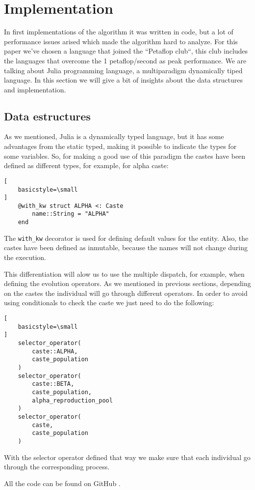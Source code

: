 \section{Implementation}

In first implementations of the algorithm it was written in code, but a lot of performance issues arised which
made the algorithm hard to analyze. For this paper we've chosen a language that joined the ``Petaflop club``, this club
includes the languages that overcome the 1 petaflop/second as peak performance. We are talking about Julia \cite{julia} 
programming language, a multiparadigm dynamically tiped language. In this section we will give a bit of insights about the 
data structures and implementation.

\subsection{Data estructures}

As we mentioned, Julia is a dynamically typed language, but it has some advantages from the static typed, making it possible
to indicate the types for some variables. So, for making a good use of this paradigm the castes have been defined as different 
types, for example, for alpha caste:

\begin{lstlisting}[
    basicstyle=\small
]
    @with_kw struct ALPHA <: Caste
        name::String = "ALPHA"
    end
\end{lstlisting}

The \lstinline{with_kw} decorator is used for defining default values for the entity. Also, the castes have been defined as inmutable,
because the names will not change during the execution.

This differentiation will alow us to use the multiple dispatch, for example, when defining the evolution operators. As we mentioned 
in previous sections, depending on the castes the individual will go through different operators. In order to avoid
using conditionals to check the caste we just need to do the following: 

\begin{lstlisting}[
    basicstyle=\small
]
    selector_operator(
        caste::ALPHA, 
        caste_population
    )
    selector_operator(
        caste::BETA, 
        caste_population, 
        alpha_reproduction_pool
    )
    selector_operator(
        caste, 
        caste_population
    )
\end{lstlisting}

With the selector operator defined that way we make sure that each individual go through the corresponding process.

All the code can be found on GitHub \cite{project_repository}.

